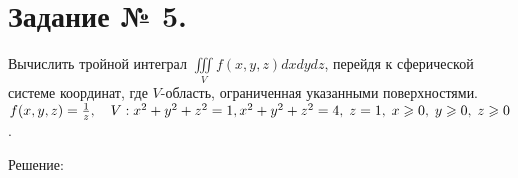 \documentclass{article}
\renewcommand{\geq}{\ensuremath{\geqslant}}
\begin{document}
\section*{Задание № 5.}
Вычислить тройной интеграл $\iiint\limits_{V} f(x,y,z)dx dy dz$, перейдя к сферической системе координат, где $V$-область, ограниченная указанными поверхностями.
$f(x,y,z)=\frac{1}{z},\quad V: x^2+y^2+z^2=1,\;\\x^2+y^2+z^2=4,\;z=1,\;x\geq0,\;y\geq0,\;z\geq0$.
\begin{center}Решение:\end{center}
\end{document}
